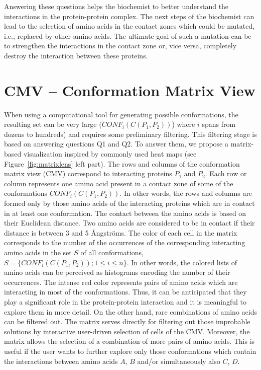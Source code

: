 \documentclass[journal]{vgtc}                %
\begin{document}
Answering these questions helps the biochemist to better understand the interactions in the protein-protein complex.
The next steps of the biochemist can lead to the selection of amino acids in the contact zones which could be mutated, i.e., replaced by other amino acids.
The ultimate goal of such a mutation can be to strengthen the interactions in the contact zone or, vice versa, completely destroy the interaction between these proteins.

\section{CMV -- Conformation Matrix View}
When using a computational tool for generating possible conformations, the resulting set can be very large ($CONF_i(C(P_1,P_2))$) where $i$ spans from dozens to hundreds) and requires some preliminary filtering.
This filtering stage is based on answering questions Q1 and Q2.
To answer them, we propose a matrix-based visualization inspired by commonly used heat maps (see Figure~\ref{fig:matrixlens} left part).
The rows and columns of the conformation matrix view (CMV) correspond to interacting proteins $P_1$ and $P_2$.
Each row or column represents one amino acid present in a contact zone of some of the conformations $CONF_i(C(P_1,P_2))$. 
In other words, the rows and columns are formed only by those amino acids of the interacting proteins which are in contact in at least one conformation.
The contact between the amino acids is based on their Euclidean distance. 
Two amino acids are considered to be in contact if their distance is between 3 and 5 \AA ngstr\"{o}ms.
The color of each cell in the matrix corresponds to the number of the occurrences of the corresponding interacting amino acids in the set $S$ of all conformations, $S = \{CONF_i(C(P_1,P_2)); 1 \leq i \leq n\}$. 
In other words, the colored lists of amino acids can be perceived as histograms encoding the number of their occurrences.
The intense red color represents pairs of amino acids which are interacting in most of the conformations.
Thus, it can be anticipated that they play a significant role in the protein-protein interaction and it is meaningful to explore them in more detail.
On the other hand, rare combinations of amino acids can be filtered out.
The matrix serves directly for filtering out those improbable solutions by interactive user-driven selection of cells of the CMV.
Moreover, the matrix allows the selection of a combination of more pairs of amino acids.
This is useful if the user wants to further explore only those conformations which contain the interactions between amino acids $A$, $B$ and/or simultaneously also $C$, $D$. 
\end{document}
